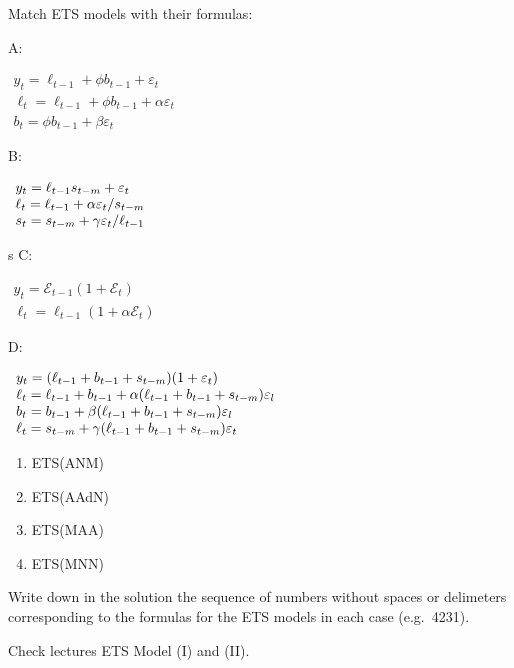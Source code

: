 
\begin{question}
Match ETS models with their formulas:

A:

\(\begin{array}{l}{{y_{t}=\ell_{t-1}+\phi b_{t-1}+\varepsilon_{t}}}\\ {{\ell_{t}=\ell_{t-1}+\phi b_{t-1}+\alpha\varepsilon_{t}}}\\ {{b_{t}=\phi b_{t-1}+\beta\varepsilon_{t}}}\end{array}\)

B:

\(\begin{array}{l c r}{{y_{t}=\ell_{t-1}s_{t-m}+\varepsilon_{t}}}\\ {{\ell_{t}=\ell_{t-1}+\alpha\varepsilon_{t}/s_{t-m}}}\\ {{s_{t}=s_{t-m}+\gamma\varepsilon_{t}/\ell_{t-1}}}\end{array}\)

s
C:

\(\begin{array}{c}{{y_{t}=\mathcal{E}_{t-1}\left(1+\mathcal{E}_{t}\right)}}\\ {{\ell_{t}=\ell_{t-1}\left(1+\alpha\mathcal{E}_{t}\right)}}\end{array}\)

D:

\(\begin{array}{l c r}{y_{t}=(\ell_{t-1}+b_{t-1}+s_{t-m})(1+\varepsilon_{t})}\\ {\ell_{t}=\ell_{t-1}+b_{t-1}+\alpha(\ell_{t-1}+b_{t-1}+s_{t-m})\varepsilon_{l}}\\ {b_{t}=b_{t-1}+\beta(\ell_{t-1}+b_{t-1}+s_{t-m})\varepsilon_{l}}\\ {\ell_{t}=s_{t-m}+\gamma(\ell_{t-1}+b_{t-1}+s_{t-m})\varepsilon_{t}}\end{array}\)

\begin{enumerate}
\def\labelenumi{\arabic{enumi}.}
\item
  ETS(ANM)
\item
  ETS(AAdN)
\item
  ETS(MAA)
\item
  ETS(MNN)
\end{enumerate}

Write down in the solution the sequence of numbers without spaces or delimeters corresponding to the formulas for the ETS models in each case (e.g.~4231).
\end{question}

\begin{solution}
Check lectures ETS Model (I) and (II).
\end{solution}

